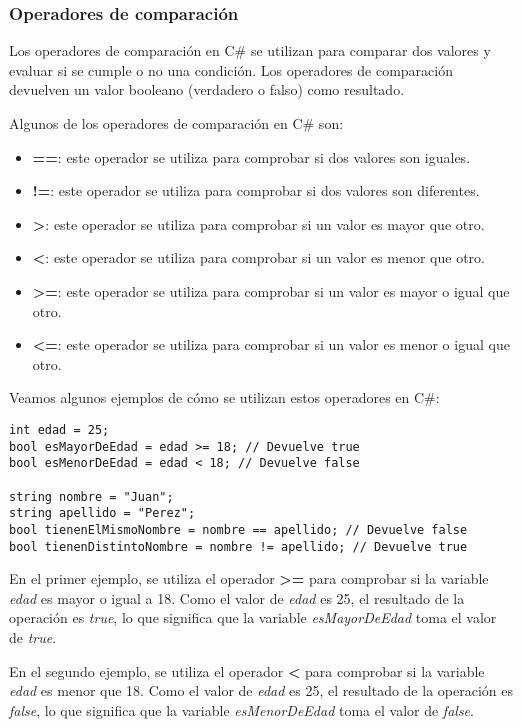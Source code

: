 \documentclass[executivepaper]{article}
\begin{document}
\subsubsection*{Operadores de comparación}

Los operadores de comparación en C\# se utilizan para comparar dos valores y evaluar si se cumple o no una condición. Los operadores de comparación devuelven un valor booleano (verdadero o falso) como resultado.

Algunos de los operadores de comparación en C\# son:

\begin{itemize}
\item \textbf{==}: este operador se utiliza para comprobar si dos valores son iguales.
\item \textbf{!=}: este operador se utiliza para comprobar si dos valores son diferentes.
\item \textbf{>}: este operador se utiliza para comprobar si un valor es mayor que otro.
\item \textbf{<}: este operador se utiliza para comprobar si un valor es menor que otro.
\item \textbf{>=}: este operador se utiliza para comprobar si un valor es mayor o igual que otro.
\item \textbf{<=}: este operador se utiliza para comprobar si un valor es menor o igual que otro.
\end{itemize}

Veamos algunos ejemplos de cómo se utilizan estos operadores en C\#:

\begin{lstlisting}
int edad = 25;
bool esMayorDeEdad = edad >= 18; // Devuelve true
bool esMenorDeEdad = edad < 18; // Devuelve false

string nombre = "Juan";
string apellido = "Perez";
bool tienenElMismoNombre = nombre == apellido; // Devuelve false
bool tienenDistintoNombre = nombre != apellido; // Devuelve true
\end{lstlisting}

En el primer ejemplo, se utiliza el operador \textbf{>=} para comprobar si la variable \emph{edad} es mayor o igual a 18. Como el valor de \emph{edad} es 25, el resultado de la operación es \emph{true}, lo que significa que la variable \emph{esMayorDeEdad} toma el valor de \emph{true}.

En el segundo ejemplo, se utiliza el operador \textbf{<} para comprobar si la variable \emph{edad} es menor que 18. Como el valor de \emph{edad} es 25, el resultado de la operación es \emph{false}, lo que significa que la variable \emph{esMenorDeEdad} toma el valor de \emph{false}.
\end{document}
